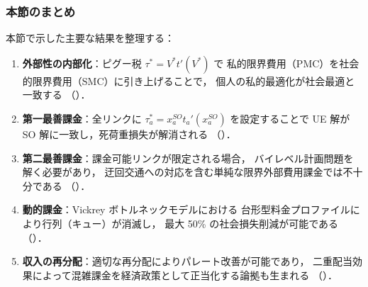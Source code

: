 \subsubsection*{本節のまとめ}

本節で示した主要な結果を整理する：
\begin{enumerate}
  \item \textbf{外部性の内部化}：ピグー税 $\tau^* = V^* t'(V^*)$ で
        私的限界費用（PMC）を社会的限界費用（SMC）に引き上げることで，
        個人の私的最適化が社会最適と一致する
        （）．
  \item \textbf{第一最善課金}：全リンクに $\tau_a^* = x_a^{SO} t_a'(x_a^{SO})$
        を設定することで UE 解が SO 解に一致し，死荷重損失が解消される
        （）．
  \item \textbf{第二最善課金}：課金可能リンクが限定される場合，
        バイレベル計画問題を解く必要があり，
        迂回交通への対応を含む単純な限界外部費用課金では不十分である
        （）．
  \item \textbf{動的課金}：Vickrey ボトルネックモデルにおける
        台形型料金プロファイルにより行列（キュー）が消滅し，
        最大 50\% の社会損失削減が可能である
        （）．
  \item \textbf{収入の再分配}：適切な再分配によりパレート改善が可能であり，
        二重配当効果によって混雑課金を経済政策として正当化する論拠も生まれる
        （）．
\end{enumerate}
